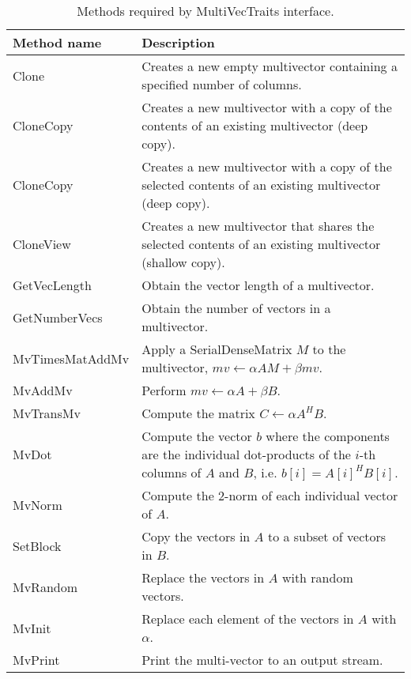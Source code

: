 \begin{table}
\begin{center}
\begin{tabular}{| p{4cm} || p{8cm} |}
\hline
Method name & Description \\
\hline\hline
Clone           & Creates a new empty multivector containing a specified number
of columns.  \\\hline
CloneCopy       & Creates a new multivector with a copy of the contents of an existing
multivector (deep copy). \\\hline
CloneCopy       & Creates a new multivector with a copy of the selected contents of
an existing multivector (deep copy).  \\\hline
CloneView       & Creates a new multivector that shares the selected contents of
an existing multivector (shallow copy).  \\\hline
GetVecLength    & Obtain the vector length of a multivector.  \\\hline
GetNumberVecs   & Obtain the number of vectors in a multivector.  \\\hline
MvTimesMatAddMv & Apply a SerialDenseMatrix $M$ to the multivector,
                  $mv \leftarrow \alpha A M + \beta mv$.  \\\hline
MvAddMv         & Perform $mv \leftarrow \alpha A + \beta B$.  \\\hline
MvTransMv       & Compute the matrix $C \leftarrow \alpha A^H B$.  \\\hline
MvDot           & Compute the vector $b$ where the components are the individual
dot-products of the $i$-th columns of $A$ and $B$, i.e. $b[i] = A[i]^H B[i]$.
\\\hline
MvNorm          & Compute the 2-norm of each individual vector of $A$.  \\\hline
SetBlock        & Copy the vectors in $A$ to a subset of vectors in $B$. \\\hline
MvRandom        & Replace the vectors in $A$ with random vectors.  \\\hline
MvInit          & Replace each element of the vectors in $A$ with $\alpha$.  \\\hline
MvPrint         & Print the multi-vector to an output stream.  \\\hline
\hline
\end{tabular}
\caption{Methods required by MultiVecTraits interface.}
\label{tab:anasazi:mvt}
\end{center}
\end{table}

